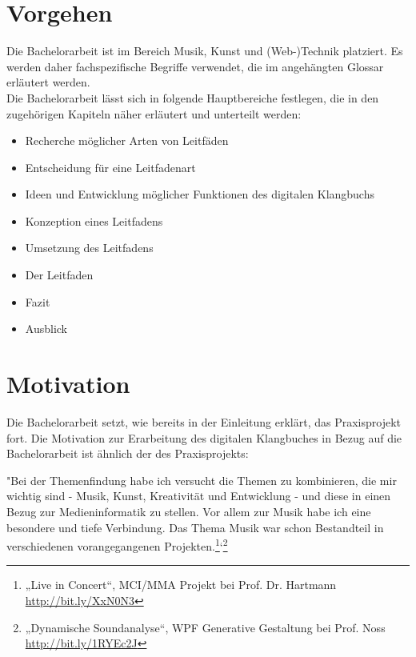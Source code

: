 \section{{Vorgehen}}\label{einleitung_vorgehen}

Die Bachelorarbeit ist im Bereich Musik, Kunst und (Web-)Technik platziert. Es werden daher fachspezifische Begriffe verwendet, die im angehängten Glossar erläutert werden.\\

Die Bachelorarbeit lässt sich in folgende Hauptbereiche festlegen, die in den zugehörigen Kapiteln näher erläutert und unterteilt werden:

\begin{itemize}
\item Recherche möglicher Arten von Leitfäden
\item Entscheidung für eine Leitfadenart
\item Ideen und Entwicklung möglicher Funktionen des digitalen Klangbuchs
\item Konzeption eines Leitfadens
\item Umsetzung des Leitfadens
\item Der Leitfaden
\item Fazit
\item Ausblick
\end{itemize}




\section{{Motivation}}\label{einleitung_motivation}
Die Bachelorarbeit setzt, wie bereits in der Einleitung erklärt, das Praxisprojekt fort. Die Motivation zur Erarbeitung des digitalen Klangbuches in Bezug auf die Bachelorarbeit ist ähnlich der des Praxisprojekts:

"Bei der Themenfindung habe ich versucht die Themen zu kombinieren, die mir wichtig sind - Musik, Kunst, Kreativität und Entwicklung - und diese in einen Bezug zur Medieninformatik zu stellen. Vor allem zur Musik habe ich eine besondere und tiefe Verbindung. Das Thema Musik war schon Bestandteil in verschiedenen vorangegangenen Projekten.\footnote{„Live in Concert“, MCI/MMA Projekt bei Prof. Dr. Hartmann \url{http://bit.ly/XxN0N3}}‘\footnote{„Dynamische Soundanalyse“, WPF Generative Gestaltung bei Prof. Noss \url{http://bit.ly/1RYEc2J}}\\

